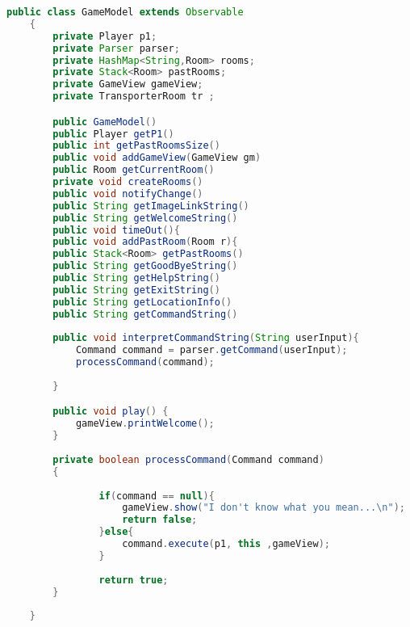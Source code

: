 \documentclass[a4paper , 10pt]{article}
\begin{document}
\begin{lstlisting}[language=Java, caption={GameModel}]
    public class GameModel extends Observable
    {
        private Player p1;
        private Parser parser;
        private HashMap<String,Room> rooms;
        private Stack<Room> pastRooms;
        private GameView gameView;
        private TransporterRoom tr ;

        public GameModel()
        public Player getP1() 
        public int getPastRoomsSize() 
        public void addGameView(GameView gm)
        public Room getCurrentRoom() 
        private void createRooms()
        public void notifyChange()
        public String getImageLinkString()
        public String getWelcomeString() 
        public void timeOut(){
        public void addPastRoom(Room r){
        public Stack<Room> getPastRooms()
        public String getGoodByeString()
        public String getHelpString()
        public String getExitString()
        public String getLocationInfo() 
        public String getCommandString()
        
        public void interpretCommandString(String userInput){
            Command command = parser.getCommand(userInput);
            processCommand(command);
    
        }

        public void play() {            
            gameView.printWelcome();
        }
    
        private boolean processCommand(Command command)
        {
    
                if(command == null){
                    gameView.show("I don't know what you mean...\n");
                    return false;
                }else{
                    command.execute(p1, this ,gameView);
                }
    
                return true;
        }
    
    }
\end{lstlisting}
\end{document}

